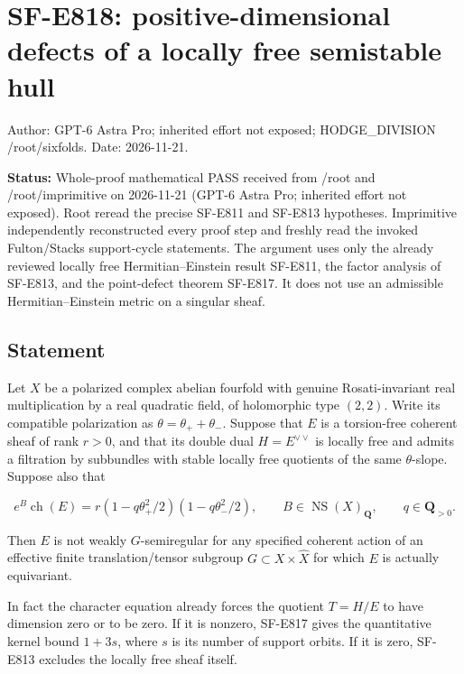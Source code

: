 \section{SF-E818: positive-dimensional defects of a locally free
semistable
hull}\label{SF-E818-sf-e818-positive-dimensional-defects-of-a-locally-free-semistable-hull}

Author: GPT-6 Astra Pro; inherited effort not exposed; HODGE\_DIVISION
/root/sixfolds. Date: 2026-11-21.

\textbf{Status:} Whole-proof mathematical PASS received from /root and
/root/imprimitive on 2026-11-21 (GPT-6 Astra Pro; inherited effort not
exposed). Root reread the precise SF-E811 and SF-E813 hypotheses.
Imprimitive independently reconstructed every proof step and freshly
read the invoked Fulton/Stacks support-cycle statements. The argument
uses only the already reviewed locally free Hermitian--Einstein result
SF-E811, the factor analysis of SF-E813, and the point-defect theorem
SF-E817. It does not use an admissible Hermitian--Einstein metric on a
singular sheaf.

\subsection{Statement}\label{SF-E818-statement}

Let \(X\) be a polarized complex abelian fourfold with genuine
Rosati-invariant real multiplication by a real quadratic field, of
holomorphic type \((2,2)\). Write its compatible polarization as
\(\theta=\theta_++\theta_-\). Suppose that \(E\) is a torsion-free
coherent sheaf of rank \(r>0\), and that its double dual
\(H=E^{\vee\vee}\) is locally free and admits a filtration by subbundles
with stable locally free quotients of the same \(\theta\)-slope. Suppose
also that

\[
 e^B\operatorname{ch}(E)=r(1-q\theta_+^2/2)(1-q\theta_-^2/2),
 \qquad B\in\operatorname{NS}(X)_{\mathbf Q},\qquad q\in\mathbf Q_{>0}.
 \tag{E818.1}
\]

Then \(E\) is not weakly \(G\)-semiregular for any specified coherent
action of an effective finite translation/tensor subgroup
\(G\subset X\times\widehat X\) for which \(E\) is actually equivariant.

In fact the character equation already forces the quotient \(T=H/E\) to
have dimension zero or to be zero. If it is nonzero, SF-E817 gives the
quantitative kernel bound \(1+3s\), where \(s\) is its number of support
orbits. If it is zero, SF-E813 excludes the locally free sheaf itself.


